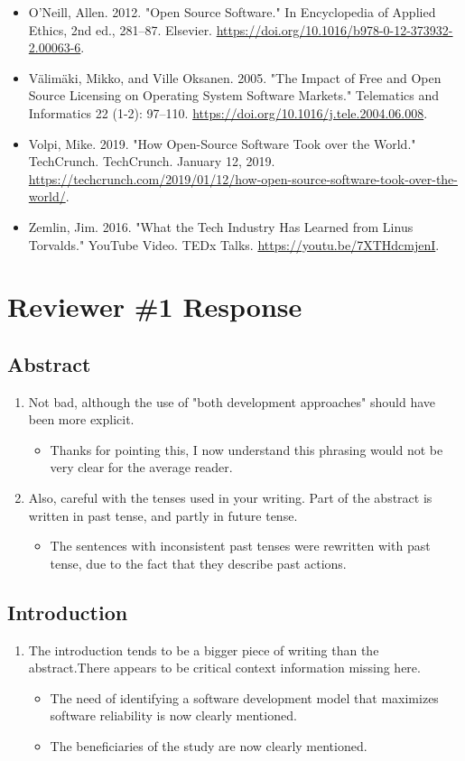 \documentclass[10pt, a4paper, fleqn]{article}
\begin{document}
\begin{itemize}
	\item O’Neill, Allen. 2012. "Open Source Software." In Encyclopedia of Applied Ethics, 2nd ed., 281–87. Elsevier. \url{https://doi.org/10.1016/b978-0-12-373932-2.00063-6}.
	\item Välimäki, Mikko, and Ville Oksanen. 2005. "The Impact of Free and Open Source Licensing on Operating System Software Markets." Telematics and Informatics 22 (1-2): 97–110. \url{https://doi.org/10.1016/j.tele.2004.06.008}.
	\item Volpi, Mike. 2019. "How Open-Source Software Took over the World." TechCrunch. TechCrunch. January 12, 2019. \url{https://techcrunch.com/2019/01/12/how-open-source-software-took-over-the-world/}.
	\item Zemlin, Jim. 2016. "What the Tech Industry Has Learned from Linus Torvalds." YouTube Video. TEDx Talks. \url{https://youtu.be/7XTHdcmjenI}.
\end{itemize}
\newpage
\section{Reviewer \#1 Response}
\subsection{Abstract}
\begin{enumerate}
	\item Not bad, although the use of "both development approaches" should have been more explicit.
	\begin{itemize}
		\item Thanks for pointing this, I now understand this phrasing would not be very clear for the average reader.
	\end{itemize}
	\item Also, careful with the tenses used in your writing. Part of the abstract is written in past tense, and partly in future tense.
	\begin{itemize}
		\item The sentences with inconsistent past tenses were rewritten with past tense, due to the fact that they describe past actions.
	\end{itemize}
\end{enumerate}
\subsection{Introduction}
\begin{enumerate}
	\item The introduction tends to be a bigger piece of writing than the abstract.There appears to be critical context information missing here.
	\begin{itemize}
		\item The need of identifying a software development model that maximizes software reliability is now clearly mentioned.
		\item The beneficiaries of the study are now clearly mentioned.
	\end{itemize}
\end{enumerate}
\end{document}
